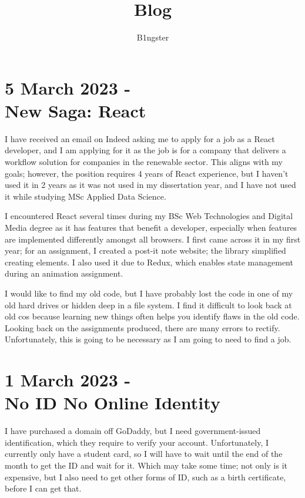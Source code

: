 \documentclass{article}
\title{Blog}
\author{B1ngster}
\date{}
\begin{document}
\maketitle
\newpage


\tableofcontents
\newpage


\section*{5 March 2023 - \\ New Saga: React}
I have received an email on Indeed asking me to apply for a job as a React developer, and I am applying for it as the job is for a company that delivers a workflow solution for companies in the renewable sector. This aligns with my goals; however, the position requires 4 years of React experience, but I haven't used it in 2 years as it was not used in my dissertation year, and I have not used it while studying MSc Applied Data Science. 

I encountered React several times during my BSc Web Technologies and Digital Media degree as it has features that benefit a developer, especially when features are implemented differently amongst all browsers. I first came across it in my first year; for an assignment, I created a post-it note website; the library simplified creating elements. I also used it due to Redux, which enables state management during an animation assignment.  

I would like to find my old code, but I have probably lost the code in one of my old hard drives or hidden deep in a file system. I find it difficult to look back at old cos because learning new things often helps you identify flaws in the old code. Looking back on the assignments produced, there are many errors to rectify. Unfortunately, this is going to be necessary as I am going to need to find a job.

 \newpage


\section*{1 March 2023 - \\No ID No Online Identity}

I have purchased a domain off GoDaddy, but I need government-issued identification, which they require to verify your account. Unfortunately, I currently only have a student card, so I will have to wait until the end of the month to get the ID and wait for it. Which may take some time; not only is it expensive, but I also need to get other forms of ID, such as a birth certificate, before I can get that. 
\end{document}
